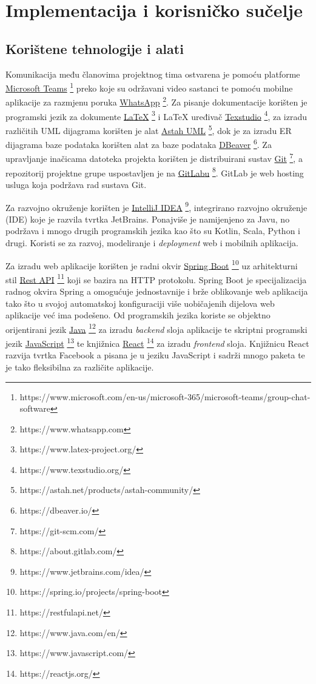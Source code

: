 \chapter{Implementacija i korisničko sučelje}
		
		
		\section{Korištene tehnologije i alati}
		
			 Komunikacija među članovima projektnog tima ostvarena je pomoću platforme  \underline{Microsoft Teams} \footnote{https://www.microsoft.com/en-us/microsoft-365/microsoft-teams/group-chat-software} preko koje su održavani video sastanci te pomoću mobilne aplikacije za razmjenu poruka \underline{WhatsApp}  \footnote{https://www.whatsapp.com}. Za pisanje dokumentacije korišten je programski jezik za dokumente \underline{LaTeX} \footnote{https://www.latex-project.org/} i LaTeX uređivač \underline{Texstudio} \footnote{https://www.texstudio.org/}, za izradu različitih UML dijagrama korišten je alat \underline{Astah UML} \footnote{https://astah.net/products/astah-community/}, dok je za izradu ER dijagrama baze podataka korišten alat za baze podataka \underline{DBeaver} \footnote{https://dbeaver.io/}. Za upravljanje inačicama datoteka projekta korišten je distribuirani sustav \underline{Git} \footnote{https://git-scm.com/}, a repozitorij projektne grupe uspostavljen je na \underline{GitLabu} \footnote{https://about.gitlab.com/}. GitLab je web hosting usluga koja podržava rad sustava Git.
			 
			 Za razvojno okruženje korišten je \underline{IntelliJ IDEA} \footnote{https://www.jetbrains.com/idea/}, integrirano razvojno okruženje (IDE) koje je razvila tvrtka JetBrains. Ponajviše je namijenjeno za Javu, no podržava i mnogo drugih programskih jezika kao što su Kotlin, Scala, Python i drugi. Koristi se za razvoj, modeliranje i \textit{deployment} web i mobilnih aplikacija. 
			 
			 Za izradu web aplikacije korišten je radni okvir \underline{Spring Boot} \footnote{https://spring.io/projects/spring-boot} uz arhitekturni stil \underline{Rest API} \footnote{https://restfulapi.net/} koji se bazira na HTTP protokolu. Spring Boot je specijalizacija radnog okvira Spring a omogućuje jednostavnije i brže oblikovanje web aplikacija tako što u svojoj automatskoj konfiguraciji više uobičajenih dijelova web aplikacije već ima podešeno. Od programskih jezika koriste se objektno orijentirani jezik \underline{Java} \footnote{https://www.java.com/en/} za izradu \textit{backend} sloja aplikacije te skriptni programski jezik \underline{JavaScript} \footnote{https://www.javascript.com/} te knjižnica \underline{React} \footnote{https://reactjs.org/}  za izradu \textit{frontend} sloja. Knjižnicu React razvija tvrtka Facebook a pisana je u jeziku JavaScript i sadrži mnogo paketa te je tako fleksibilna za različite aplikacije. 
			 
